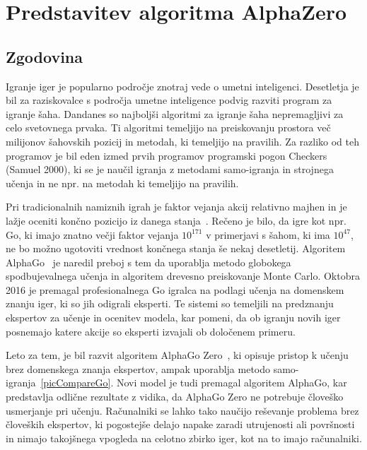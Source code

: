 \documentclass[a4paper, 12pt]{book}
\begin{document}

\chapter{Predstavitev algoritma AlphaZero}
\label{alphazero}
\section{Zgodovina}

Igranje iger je popularno področje znotraj vede o umetni inteligenci. 
Desetletja je bil za raziskovalce s področja umetne inteligence podvig razviti program za igranje šaha.
Dandanes so najboljši algoritmi za igranje šaha nepremagljivi za celo svetovnega prvaka.
Ti algoritmi temeljijo na preiskovanju prostora več milijonov šahovskih pozicij in metodah, ki temeljijo na pravilih.
Za razliko od teh programov je bil eden izmed prvih programov programski pogon Checkers (Samuel 2000), ki se je naučil igranja z metodami samo-igranja in strojnega učenja in ne npr. na metodah ki temeljijo na pravilih.

Pri tradicionalnih namiznih igrah je faktor vejanja akcij relativno majhen in je lažje oceniti končno pozicijo iz danega stanja~\cite{wiki:AlphaGo}.
Rečeno je bilo, da igre kot npr. Go, ki imajo znatno večji faktor vejanja $10^{171}$ v primerjavi s šahom, ki ima $10^{47}$, ne bo možno ugotoviti vrednost končnega stanja še nekaj desetletij.
Algoritem AlphaGo~\cite{silver2016mastering} je naredil preboj s tem da uporablja metodo globokega spodbujevalnega učenja in algoritem drevesno preiskovanje Monte Carlo. 
Oktobra 2016 je premagal profesionalnega Go igralca na podlagi učenja na domenskem znanju iger, ki so jih odigrali eksperti.
Te sistemi so temeljili na predznanju ekspertov za učenje in ocenitev modela, kar pomeni, da ob igranju novih iger posnemajo katere akcije so eksperti izvajali ob določenem primeru.

Leto za tem, je bil razvit algoritem AlphaGo Zero~\cite{silver2017mastering}, ki opisuje pristop k učenju brez domenskega znanja ekspertov, ampak uporablja metodo samo-igranja~\ref{picCompareGo}. 
Novi model je tudi premagal algoritem AlphaGo, kar predstavlja odlične rezultate z vidika, da AlphaGo Zero ne potrebuje človeško usmerjanje pri učenju.
Računalniki se lahko tako naučijo reševanje problema brez človeških ekspertov, ki pogostejše delajo napake zaradi utrujenosti ali površnosti in nimajo takojšnega vpogleda na celotno zbirko iger, kot na to imajo računalniki.
\end{document}
